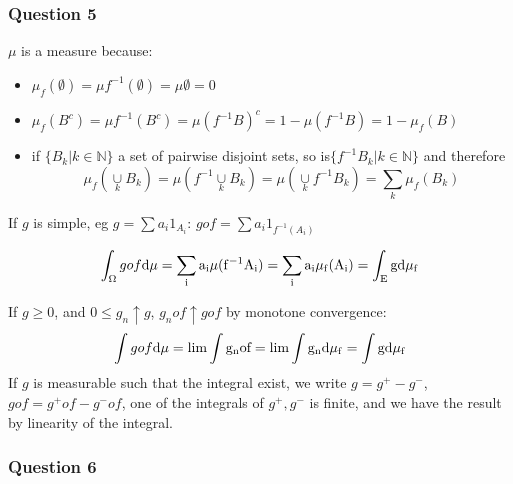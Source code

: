 \documentclass[12pt]{article}
\newcommand{\Q}[1]{\subsubsection*{Question #1}}
\newcommand{\union}[1]{\underset{#1}{\cup} }
\begin{document}
\Q{5}
$\mu$ is a measure because:
\begin{itemize}
\item $\mu_f(\emptyset) = \mu f^{-1}(\emptyset) = \mu \emptyset = 0$
\item $\mu_f(B^c) = \mu f^{-1}(B^c) = \mu (f^{-1}B)^c = 1 - \mu(f^{-1}B) = 1 - \mu_f(B)$
\item if $\{B_k | k \in \mathbb{N}\}$ a set of pairwise disjoint sets, so is$\{ f^{-1} B_k | k \in \mathbb{N}\}$ and therefore $$\mu_f(\union{k} B_k) = \mu(f^{-1}\union{k}B_k) = \mu(\union{k}f^{-1}B_k) = \sum_k \mu_f(B_k)$$
\end{itemize}


If $g$ is simple, eg $g = \sum a_i 1_{A_i}$: $gof = \sum a_i 1_{f^{-1}(A_i)}$

$$\int_{\Omega} g o f \rm{d}\mu = \sum_i a_i \mu(f^{-1}A_i) = \sum_i a_i \mu_f(A_i) = \int_E g  \rm{d}\mu_f$$

If $g \geq 0$, and $0 \leq g_n \uparrow g$, $g_nof \uparrow gof$  by monotone convergence:
$$\int gof \rm d \mu= \lim\int g_nof  = \lim \int g_n \rm{d}\mu_f = \int g \rm{d}\mu_f$$
If $g$ is measurable such that the integral exist, we write $g = g^+ - g^-$,$gof = g^+of - g^-of$, one of the integrals of $g^+, g^-$ is finite, and we have the result by linearity of the integral. 

\Q{6}
\end{document}
